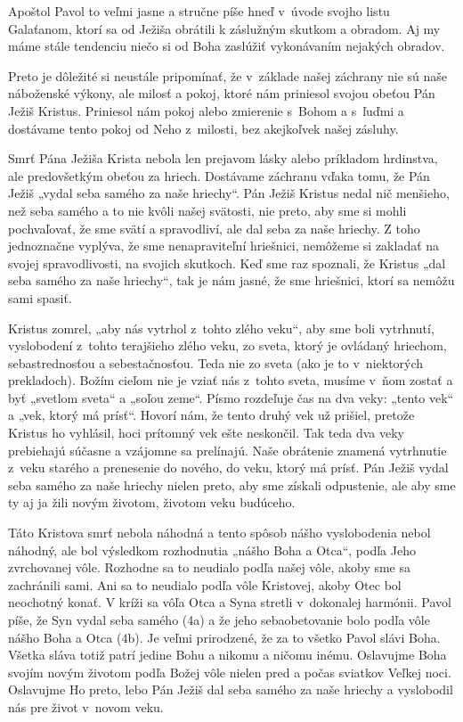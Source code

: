 Apoštol Pavol to veľmi jasne a stručne píše hneď v~úvode svojho listu Galaťanom, ktorí sa od Ježiša obrátili k záslužným skutkom a obradom. Aj my máme stále tendenciu niečo si od Boha zaslúžiť vykonávaním nejakých obradov.

Preto je dôležité si neustále pripomínať, že v~základe našej záchrany nie sú naše náboženské výkony, ale milosť a pokoj, ktoré nám priniesol svojou obeťou Pán Ježiš Kristus. Priniesol nám pokoj alebo zmierenie s~Bohom a s~ľuďmi a dostávame tento pokoj od Neho z~milosti, bez akejkoľvek našej zásluhy.

Smrť Pána Ježiša Krista nebola len prejavom lásky alebo príkladom hrdinstva, ale predovšetkým obeťou za hriech. Dostávame záchranu vďaka tomu, že Pán Ježiš „vydal seba samého za naše hriechy“. Pán Ježiš Kristus nedal nič menšieho, než seba samého a to nie kvôli našej svätosti, nie preto, aby sme si mohli pochvaľovať, že sme svätí a spravodliví, ale dal seba za naše hriechy. Z toho jednoznačne vyplýva, že sme nenapraviteľní hriešnici, nemôžeme si zakladať na svojej spravodlivosti, na svojich skutkoch. Keď sme raz spoznali, že Kristus „dal seba samého za naše hriechy“, tak je nám jasné, že sme hriešnici, ktorí sa nemôžu sami spasiť.

Kristus zomrel, „aby nás vytrhol z~tohto zlého veku“, aby sme boli vytrhnutí, vyslobodení z~tohto terajšieho zlého veku, zo sveta, ktorý je ovládaný hriechom, sebastrednosťou a sebestačnosťou. Teda nie zo sveta (ako je to v~niektorých prekladoch). Božím cieľom nie je vziať nás z~tohto sveta,  musíme v~ňom zostať a byť „svetlom sveta“ a „soľou zeme“. Písmo rozdeľuje čas na dva veky: „tento vek“ a „vek, ktorý má prísť“. Hovorí nám, že tento druhý vek už prišiel, pretože Kristus ho vyhlásil, hoci prítomný vek ešte neskončil. Tak teda dva veky prebiehajú súčasne a vzájomne sa prelínajú. Naše obrátenie znamená vytrhnutie z~veku starého a prenesenie do nového, do veku, ktorý má prísť.  Pán Ježiš vydal seba samého za naše hriechy nielen preto, aby sme získali odpustenie, ale aby sme ty aj ja žili novým životom, životom veku budúceho.

Táto Kristova smrť nebola náhodná a tento spôsob nášho vyslobodenia nebol náhodný, ale bol výsledkom rozhodnutia „nášho Boha a Otca“, podľa Jeho zvrchovanej vôle. Rozhodne sa to neudialo podľa našej vôle, akoby sme sa zachránili sami. Ani sa to neudialo podľa vôle Kristovej, akoby Otec bol neochotný konať. V kríži sa vôľa Otca a Syna stretli v~dokonalej harmónii. Pavol píše, že Syn vydal seba samého (4a) a že jeho sebaobetovanie bolo podľa vôle nášho Boha a Otca (4b).
Je veľmi prirodzené, že za to všetko Pavol slávi Boha. Všetka sláva totiž patrí jedine Bohu a nikomu a ničomu inému. Oslavujme Boha svojím novým životom podľa Božej vôle nielen pred a počas sviatkov Veľkej noci. Oslavujme Ho preto, lebo Pán Ježiš dal seba samého za naše hriechy a vyslobodil nás pre život v~novom veku.

